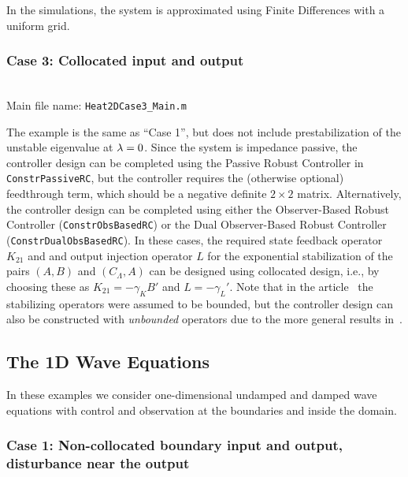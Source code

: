 \documentclass[11pt, a4paper]{amsart}
\newcommand{\CL}{C_\Lambda}
\theoremstyle{definition}
\numberwithin{equation}{section}
\begin{document}
In the simulations, the system is approximated using Finite Differences with a uniform grid. 


\medskip

\subsubsection*{Case 3: Collocated input and output}
~\\[-1ex]


  \noindent Main file name: \texttt{Heat2DCase3\_Main.m}

\medskip

The example is the same as ``Case 1'', but does not include prestabilization of the unstable eigenvalue at $\lambda = 0$. Since the system is impedance passive, the controller design can be completed using the Passive Robust Controller in \texttt{ConstrPassiveRC}, but the controller requires the (otherwise optional) feedthrough term, which should be a negative definite $2\times 2$ matrix. Alternatively, the controller design can be completed using either the Observer-Based Robust Controller (\texttt{ConstrObsBasedRC}) or the Dual Observer-Based Robust Controller (\texttt{ConstrDualObsBasedRC}). In these cases, the required state feedback operator $K_{21}$ and and output injection operator $L$ for the exponential stabilization of the pairs $(A,B)$ and $(\CL,A)$ can be designed using collocated design, i.e., by choosing these as  $K_{21}=-\gamma_K B'$ and $L=-\gamma_L '$. Note that in the article~\cite{Pau16a} the stabilizing operators were assumed to be bounded, but the controller design can also be constructed with \emph{unbounded} operators due to the more general results in~\cite{Pau17b}.

\subsection{The 1D Wave Equations}

In these examples we consider  one-dimen\-sional undamped and damped wave equations with control and observation at the boundaries and inside the domain. 

\medskip

\subsubsection*{Case 1: Non-collocated boundary input and output, disturbance near the output}
~\\[-1ex]
\end{document}
